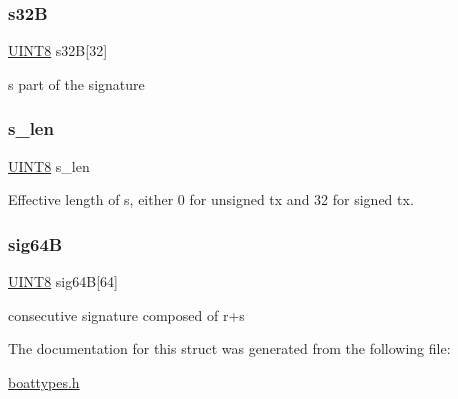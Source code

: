 \subsubsection{\texorpdfstring{s32B}{s32B}}
{\footnotesize\ttfamily \mbox{\hyperlink{boattypes_8h_ab27e9918b538ce9d8ca692479b375b6a}{U\+I\+N\+T8}} s32B\mbox{[}32\mbox{]}}



s part of the signature 

\mbox{\label{struct_t_tx_field_sig_a36dbce8d788801d4e5542477c95172bb}} 
\subsubsection{\texorpdfstring{s\+\_\+len}{s\_len}}
{\footnotesize\ttfamily \mbox{\hyperlink{boattypes_8h_ab27e9918b538ce9d8ca692479b375b6a}{U\+I\+N\+T8}} s\+\_\+len}



Effective length of s, either 0 for unsigned tx and 32 for signed tx. 

\mbox{\label{struct_t_tx_field_sig_a6ed37aa000b28da3bee862b39e3e86a4}} 
\subsubsection{\texorpdfstring{sig64B}{sig64B}}
{\footnotesize\ttfamily \mbox{\hyperlink{boattypes_8h_ab27e9918b538ce9d8ca692479b375b6a}{U\+I\+N\+T8}} sig64B\mbox{[}64\mbox{]}}



consecutive signature composed of r+s 



The documentation for this struct was generated from the following file\+:\begin{DoxyCompactItemize}
\item 
\mbox{\hyperlink{boattypes_8h}{boattypes.\+h}}\end{DoxyCompactItemize}
